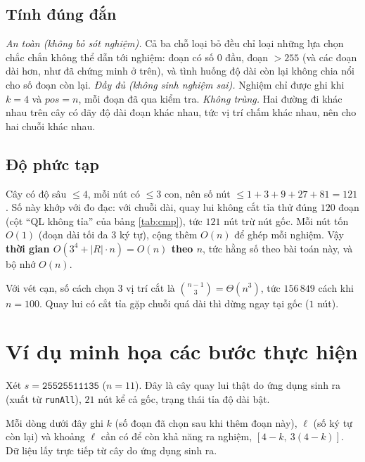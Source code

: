 \documentclass[12pt,a4paper]{article}
\begin{document}
\subsection{Tính đúng đắn}
\emph{An toàn (không bỏ sót nghiệm).} Cả ba chỗ loại bỏ đều chỉ loại những lựa chọn chắc chắn không thể dẫn tới nghiệm: đoạn có số $0$ đầu, đoạn $>255$ (và các đoạn dài hơn, như đã chứng minh ở trên), và tình huống độ dài còn lại không chia nổi cho số đoạn còn lại. \emph{Đầy đủ (không sinh nghiệm sai).} Nghiệm chỉ được ghi khi $k=4$ và $pos=n$, mỗi đoạn đã qua kiểm tra. \emph{Không trùng.} Hai đường đi khác nhau trên cây có dãy độ dài đoạn khác nhau, tức vị trí chấm khác nhau, nên cho hai chuỗi khác nhau.

\subsection{Độ phức tạp}
Cây có độ sâu $\le 4$, mỗi nút có $\le 3$ con, nên số nút $\le 1 + 3 + 9 + 27 + 81 = 121$. Số này khớp với đo đạc: với chuỗi dài, quay lui không cắt tỉa thử đúng $120$ đoạn (cột ``QL không tỉa'' của bảng \ref{tab:cmp}), tức $121$ nút trừ nút gốc. Mỗi nút tốn $O(1)$ (đoạn dài tối đa $3$ ký tự), cộng thêm $O(n)$ để ghép mỗi nghiệm. Vậy \textbf{thời gian $O(3^4 + |R| \cdot n) = O(n)$ theo $n$}, tức hằng số theo bài toán này, và bộ nhớ $O(n)$.

Với vét cạn, số cách chọn $3$ vị trí cắt là $\binom{n-1}{3} = \Theta(n^3)$, tức $156\,849$ cách khi $n=100$. Quay lui có cắt tỉa gặp chuỗi quá dài thì dừng ngay tại gốc ($1$ nút).

\section{Ví dụ minh họa các bước thực hiện}\label{sec:example}

Xét $s = \texttt{25525511135}$ ($n=11$). Đây là cây quay lui thật do ứng dụng sinh ra (xuất từ \texttt{runAll}), $21$ nút kể cả gốc, trạng thái tỉa độ dài bật.

Mỗi dòng dưới đây ghi $k$ (số đoạn đã chọn sau khi thêm đoạn này), $\ell$ (số ký tự còn lại) và khoảng $\ell$ cần có để còn khả năng ra nghiệm, $[4-k,\ 3(4-k)]$. Dữ liệu lấy trực tiếp từ cây do ứng dụng sinh ra.
\end{document}
